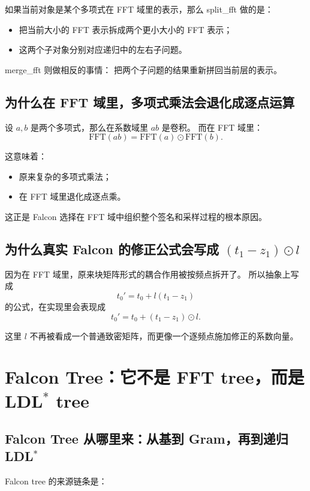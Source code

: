 \documentclass[11pt,a4paper]{ctexart}
\begin{document}
如果当前对象是某个多项式在 FFT 域里的表示，那么 split\_fft 做的是：

\begin{itemize}
    \item 把当前大小的 FFT 表示拆成两个更小大小的 FFT 表示；
    \item 这两个子对象分别对应递归中的左右子问题。
\end{itemize}

merge\_fft 则做相反的事情：  
把两个子问题的结果重新拼回当前层的表示。

\subsection{为什么在 FFT 域里，多项式乘法会退化成逐点运算}

设 \(a,b\) 是两个多项式，那么在系数域里 \(ab\) 是卷积。  
而在 FFT 域里：
\[
\mathrm{FFT}(ab)=\mathrm{FFT}(a)\odot \mathrm{FFT}(b).
\]

这意味着：

\begin{itemize}
    \item 原来复杂的多项式乘法；
    \item 在 FFT 域里退化成逐点乘。
\end{itemize}

这正是 Falcon 选择在 FFT 域中组织整个签名和采样过程的根本原因。

\subsection{为什么真实 Falcon 的修正公式会写成 \((t_1-z_1)\odot l\)}

因为在 FFT 域里，原来块矩阵形式的耦合作用被按频点拆开了。  
所以抽象上写成
\[
t_0' = t_0 + l(t_1-z_1)
\]
的公式，在实现里会表现成
\[
t_0' = t_0 + (t_1-z_1)\odot l.
\]

这里 \(l\) 不再被看成一个普通致密矩阵，而更像一个逐频点施加修正的系数向量。

\section{Falcon Tree：它不是 FFT tree，而是 LDL\(^*\) tree}

\subsection{Falcon Tree 从哪里来：从基到 Gram，再到递归 LDL\(^*\)}

Falcon tree 的来源链条是：
\end{document}
